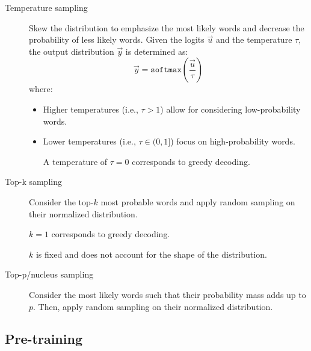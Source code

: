 \begin{description}
\begin{description}
            \item[Temperature sampling]
                Skew the distribution to emphasize the most likely words and decrease the probability of less likely words. Given the logits $\vec{u}$ and the temperature $\tau$, the output distribution $\vec{y}$ is determined as:
                \[ \vec{y} = \texttt{softmax}\left( \frac{\vec{u}}{\tau} \right) \]
                where:
                \begin{itemize}
                    \item Higher temperatures (i.e., $\tau > 1$) allow for considering low-probability words.
                    \item Lower temperatures (i.e., $\tau \in (0, 1]$) focus on high-probability words.
                    \begin{remark}
                        A temperature of $\tau = 0$ corresponds to greedy decoding.
                    \end{remark}
                \end{itemize}


            \item[Top-k sampling]
                Consider the top-$k$ most probable words and apply random sampling on their normalized distribution.

                \begin{remark}
                    $k=1$ corresponds to greedy decoding.
                \end{remark}

                \begin{remark}
                    $k$ is fixed and does not account for the shape of the distribution.
                \end{remark}

            \item[Top-p/nucleus sampling]
                Consider the most likely words such that their probability mass adds up to $p$. Then, apply random sampling on their normalized distribution.
        \end{description}
\end{description}


\subsection{Pre-training}

